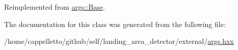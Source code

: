 Reimplemented from \hyperlink{classargs_1_1_base_ac7cfc851174f71e00173121d3013dab1}{args\+::\+Base}.



The documentation for this class was generated from the following file\+:\begin{DoxyCompactItemize}
\item 
/home/cappelletto/github/self/landing\+\_\+area\+\_\+detector/external/\hyperlink{args_8hxx}{args.\+hxx}\end{DoxyCompactItemize}
